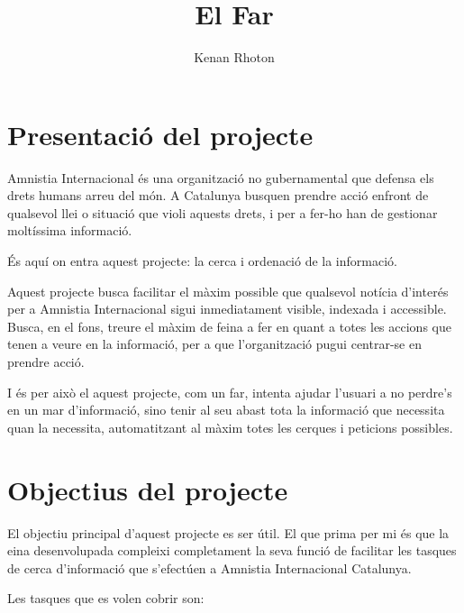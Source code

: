 \documentclass{article}
\title{El Far}
\author{Kenan Rhoton}
\begin{document}
\maketitle

\section{Presentació del projecte}

Amnistia Internacional és una organització no gubernamental que defensa els drets humans arreu del món. A Catalunya busquen prendre acció enfront de qualsevol llei o situació que violi aquests drets, i per a fer-ho han de gestionar moltíssima informació.

És aquí on entra aquest projecte: la cerca i ordenació de la informació.

Aquest projecte busca facilitar el màxim possible que qualsevol notícia d'interés per a Amnistia Internacional sigui inmediatament visible, indexada i accessible. Busca, en el fons, treure el màxim de feina a fer en quant a totes les accions que tenen a veure en la informació, per a que l'organització pugui centrar-se en prendre acció.

I és per això el aquest projecte, com un far, intenta ajudar l'usuari a no perdre's en un mar d'informació, sino tenir al seu abast tota la informació que necessita quan la necessita, automatitzant al màxim totes les cerques i peticions possibles.

\newpage

\section{Objectius del projecte}

El objectiu principal d'aquest projecte es ser útil. El que prima per mi és que la eina desenvolupada compleixi completament la seva funció de facilitar les tasques de cerca d'informació que s'efectúen a Amnistia Internacional Catalunya.

Les tasques que es volen cobrir son:
\end{document}
